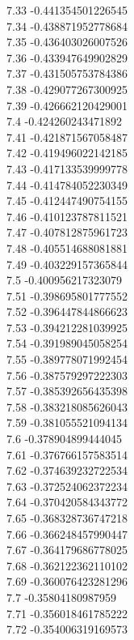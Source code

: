{7.33	-0.441354501226545\\
7.34	-0.438871952778684\\
7.35	-0.436403026007526\\
7.36	-0.433947649902829\\
7.37	-0.431505753784386\\
7.38	-0.429077267300925\\
7.39	-0.426662120429001\\
7.4	-0.424260243471892\\
7.41	-0.421871567058487\\
7.42	-0.419496022142185\\
7.43	-0.417133539999778\\
7.44	-0.414784052230349\\
7.45	-0.412447490754155\\
7.46	-0.410123787811521\\
7.47	-0.407812875961723\\
7.48	-0.405514688081881\\
7.49	-0.403229157365844\\
7.5	-0.400956217323079\\
7.51	-0.398695801777552\\
7.52	-0.396447844866623\\
7.53	-0.394212281039925\\
7.54	-0.391989045058254\\
7.55	-0.389778071992454\\
7.56	-0.387579297222303\\
7.57	-0.385392656435398\\
7.58	-0.383218085626043\\
7.59	-0.381055521094134\\
7.6	-0.378904899444045\\
7.61	-0.376766157583514\\
7.62	-0.374639232722534\\
7.63	-0.372524062372234\\
7.64	-0.370420584343772\\
7.65	-0.368328736747218\\
7.66	-0.366248457990447\\
7.67	-0.364179686778025\\
7.68	-0.362122362110102\\
7.69	-0.360076423281296\\
7.7	-0.35804180987959\\
7.71	-0.356018461785222\\
7.72	-0.354006319169573\\
}
